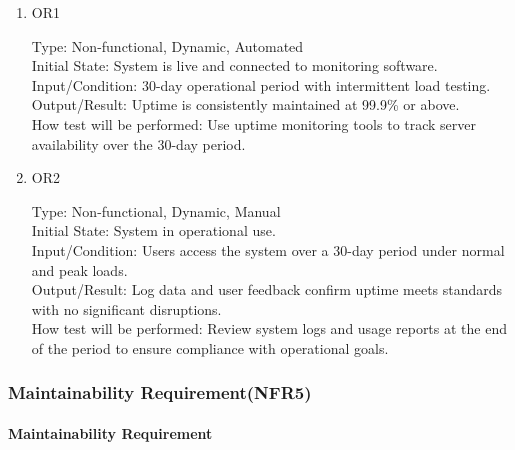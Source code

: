 \documentclass[12pt, titlepage]{article}
\begin{document}
\begin{enumerate}
    \item{OR1\\}
    
    Type: Non-functional, Dynamic, Automated\\
    
    Initial State: System is live and connected to monitoring software.\\
    
    Input/Condition: 30-day operational period with intermittent load testing.\\
    
    Output/Result: Uptime is consistently maintained at 99.9\% or above.\\
    
    How test will be performed: Use uptime monitoring tools to track server availability over the 30-day period.

    \item{OR2\\}
    
    Type: Non-functional, Dynamic, Manual\\
    
    Initial State: System in operational use.\\
    
    Input/Condition: Users access the system over a 30-day period under normal and peak loads.\\
    
    Output/Result: Log data and user feedback confirm uptime meets standards with no significant disruptions.\\
    
    How test will be performed: Review system logs and usage reports at the end of the period to ensure compliance with operational goals.
\end{enumerate}

\subsubsection{Maintainability Requirement(NFR5)}

\paragraph{Maintainability Requirement}
\end{document}
